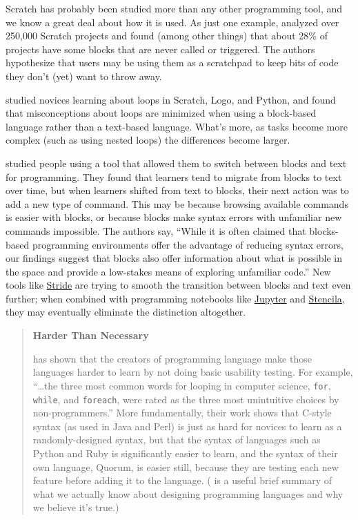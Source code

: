 Scratch has probably been studied more than any other programming tool,
and we know a great deal about how it is used. As just one example,
\cite{Aiva2016} analyzed over 250,000 Scratch projects and found
(among other things) that about 28\% of projects have some blocks that
are never called or triggered. The authors hypothesize that users may be
using them as a scratchpad to keep bits of code they don't (yet) want to
throw away.

\cite{Grov2017,Mlad2017} studied novices learning about loops in
Scratch, Logo, and Python, and found that misconceptions about loops are
minimized when using a block-based language rather than a text-based
language. What's more, as tasks become more complex (such as using
nested loops) the differences become larger.

\cite{Wein2017a} studied people using a tool that allowed them to
switch between blocks and text for programming. They found that
learners tend to migrate from blocks to text over time, but when
learners shifted from text to blocks, their next action was to add a
new type of command. This may be because browsing available commands
is easier with blocks, or because blocks make syntax errors with
unfamiliar new commands impossible. The authors say, ``While it is
often claimed that blocks-based programming environments offer the
advantage of reducing syntax errors, our findings suggest that blocks
also offer information about what is possible in the space and provide
a low-stakes means of exploring unfamiliar code.'' New tools like
\href{https://www.greenfoot.org/frames/}{Stride} are trying to smooth the transition between blocks
and text even further; when combined with programming notebooks like
\href{http://jupyter.org/}{Jupyter} and \href{http://stenci.la/}{Stencila}, they may eventually
eliminate the distinction altogether.

\begin{quote}\setlength{\parindent}{0pt}
\textbf{Harder Than Necessary}

\cite{Stef2013} has shown that the creators of programming language
make those languages harder to learn by not doing basic usability
testing. For example, ``\ldots{}the three most common words for
looping in computer science, \texttt{for}, \texttt{while}, and \texttt{foreach}, were rated
as the three most unintuitive choices by non-programmers.'' More
fundamentally, their work shows that C-style syntax (as used in Java
and Perl) is just as hard for novices to learn as a randomly-designed
syntax, but that the syntax of languages such as Python and Ruby is
significantly easier to learn, and the syntax of their own language,
Quorum, is easier still, because they are testing each new feature
before adding it to the language. (\cite{Stef2017} is a useful
brief summary of what we actually know about designing programming
languages and why we believe it's true.)
\end{quote}

